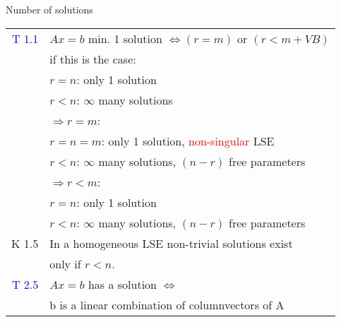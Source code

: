 \begin{mainbox}{Number of solutions}
\setlength{\tabcolsep}{2pt}
\begin{tabular}{rl}
	\textcolor{blue}{T 1.1} & $Ax = b$ min. 1 solution $\Leftrightarrow (r = m)$ or $(r < m + VB)$\\
	& if this is the case:\\
	& \tabitem $r = n$: only 1 solution\\
	& \tabitem $r < n$: $\infty$ many solutions\\
	& $\Rightarrow r = m$:\\
	& \tabitem $r = n = m$: only 1 solution, \textcolor{red}{non-singular} LSE\\
	& \tabitem $r < n$: $\infty$ many solutions, $(n-r)$ free parameters\\
	& $\Rightarrow r < m$:\\
	& \tabitem $r = n$: only 1 solution\\
	& \tabitem $r < n$: $\infty$ many solutions, $(n-r)$ free parameters\\
	\rule{0pt}{3ex}
	K 1.5 & In a homogeneous LSE non-trivial solutions exist\\
	& only if $r < n$.\\
	\rule{0pt}{3ex}
	\textcolor{blue}{T 2.5} & $Ax = b$ has a solution $\Leftrightarrow$\\
	& b is a linear combination of columnvectors of A\\
\end{tabular}\\
\end{mainbox}